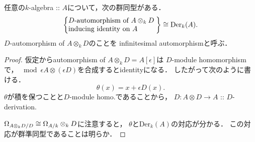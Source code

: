 \documentclass[a4paper]{jsarticle}
\newcommand{\Der}{\mathrm{Der}}
\begin{document}
    \begin{Lemma} \label{lemma:inf_auto_and_Der}
        任意の$k$-algebra :: $A$について，次の群同型がある．
        \[
            \left\{\parbox{4.4cm}{
                $D$-automorphism of $A \otimes_k D$ \\
                inducing identity on $A$
            }\right\}
            \iso
            \Der_{k}(A).
        \]
        $D$-automorphism of $A \otimes_k D$のことを
        infinitesimal automorphismと呼ぶ．
    \end{Lemma}
    \begin{proof}
        仮定からautomorphism of $A \otimes_k D=A[\epsilon]$は
        $D$-module homomorphismで，
        $\bmod \epsilon A \otimes (\epsilon D)$を合成するとidentityになる．
        したがって次のように書ける．
        \[ \theta(x)=x+\epsilon D(x). \]
        $\theta$が積を保つことと$D$-module homo.であることから，
        $D: A \otimes D \to A$ :: $D$-derivation.

        $\Omega_{A \otimes_{k} D/D} \cong \Omega_{A/k} \otimes_{k} D$に注意すると，
        $\theta$と$\Der_{k}(A)$の対応が分かる．
        この対応が群準同型であることは明らか．
    \end{proof}
\end{document}
